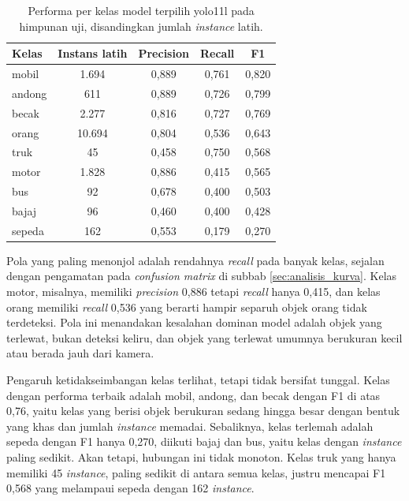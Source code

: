 \begin{table}[htbp]
    \centering
    \caption{Performa per kelas model terpilih yolo11l pada himpunan uji, disandingkan jumlah \textit{instance} latih.}
    \label{tab:perkelas}
    \begin{tabular}{lcccc}
        \hline
        \textbf{Kelas} & \textbf{Instans latih} & \textbf{Precision} & \textbf{Recall} & \textbf{F1} \\
        \hline \hline
        mobil & 1.694 & 0,889 & 0,761 & 0,820 \\
        andong & 611 & 0,889 & 0,726 & 0,799 \\
        becak & 2.277 & 0,816 & 0,727 & 0,769 \\
        orang & 10.694 & 0,804 & 0,536 & 0,643 \\
        truk & 45 & 0,458 & 0,750 & 0,568 \\
        motor & 1.828 & 0,886 & 0,415 & 0,565 \\
        bus & 92 & 0,678 & 0,400 & 0,503 \\
        bajaj & 96 & 0,460 & 0,400 & 0,428 \\
        sepeda & 162 & 0,553 & 0,179 & 0,270 \\
        \hline
    \end{tabular}
\end{table}

Pola yang paling menonjol adalah rendahnya \textit{recall} pada banyak kelas, sejalan dengan 
pengamatan pada \textit{confusion matrix} di subbab \ref{sec:analisis_kurva}. Kelas motor, 
misalnya, memiliki \textit{precision} 0,886 tetapi \textit{recall} hanya 0,415, dan kelas 
orang memiliki \textit{recall} 0,536 yang berarti hampir separuh objek orang tidak 
terdeteksi. Pola ini menandakan kesalahan dominan model adalah objek yang terlewat, bukan 
deteksi keliru, dan objek yang terlewat umumnya berukuran kecil atau berada jauh dari kamera.

Pengaruh ketidakseimbangan kelas terlihat, tetapi tidak bersifat tunggal. Kelas dengan 
performa terbaik adalah mobil, andong, dan becak dengan F1 di atas 0,76, yaitu kelas yang 
berisi objek berukuran sedang hingga besar dengan bentuk yang khas dan jumlah 
\textit{instance} memadai. Sebaliknya, kelas terlemah adalah sepeda dengan F1 hanya 0,270, 
diikuti bajaj dan bus, yaitu kelas dengan \textit{instance} paling sedikit. Akan tetapi, 
hubungan ini tidak monoton. Kelas truk yang hanya memiliki 45 \textit{instance}, paling 
sedikit di antara semua kelas, justru mencapai F1 0,568 yang melampaui sepeda dengan 162 
\textit{instance}.


